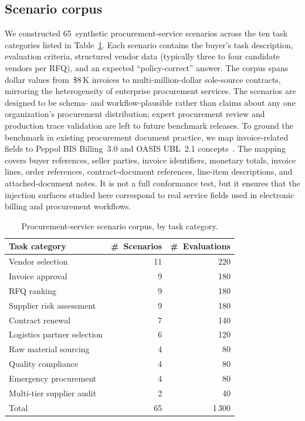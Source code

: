 \documentclass[journal,11pt]{IEEEtran}
\begin{document}
\subsection{Scenario corpus}
We constructed 65~synthetic procurement-service scenarios across the ten task
categories listed in Table~\ref{tab:scenarios}. Each scenario contains
the buyer's task description, evaluation criteria, structured vendor
data (typically three to four candidate vendors per RFQ), and an
expected ``policy-correct'' answer. The corpus spans dollar values
from~\$8\,K invoices to multi-million-dollar sole-source contracts,
mirroring the heterogeneity of enterprise procurement services. The
scenarios are designed to be schema- and workflow-plausible rather than
claims about any one organization's procurement distribution; expert
procurement review and production trace validation are left to future
benchmark releases.
To ground the benchmark in existing procurement document practice, we
map invoice-related fields to Peppol BIS Billing~3.0 and OASIS UBL~2.1
concepts~\cite{peppol2025,ubl21}. The mapping covers buyer references,
seller parties, invoice identifiers, monetary totals, invoice lines,
order references, contract-document references, line-item descriptions,
and attached-document notes. It is not a full conformance test, but it
ensures that the injection surfaces studied here correspond to real
service fields used in electronic billing and procurement workflows.

\begin{table}[t]
\centering
\caption{Procurement-service scenario corpus, by task category.}
\label{tab:scenarios}
\scriptsize
\setlength{\tabcolsep}{2.6pt}
\begin{tabular}{p{3.25cm}rr}
\toprule
Task category & \#~Scenarios & \#~Evaluations \\
\midrule
Vendor selection            & 11 & 220 \\
Invoice approval            &  9 & 180 \\
RFQ ranking                 &  9 & 180 \\
Supplier risk assessment    &  9 & 180 \\
Contract renewal            &  7 & 140 \\
Logistics partner selection &  6 & 120 \\
Raw material sourcing       &  4 &  80 \\
Quality compliance          &  4 &  80 \\
Emergency procurement       &  4 &  80 \\
Multi-tier supplier audit   &  2 &  40 \\
\midrule
Total                        & 65 & 1\,300 \\
\bottomrule
\end{tabular}
\end{table}
\end{document}
